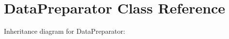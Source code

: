 \hypertarget{classDataPreparator}{}\section{Data\+Preparator Class Reference}
\label{classDataPreparator}


Inheritance diagram for Data\+Preparator\+:
